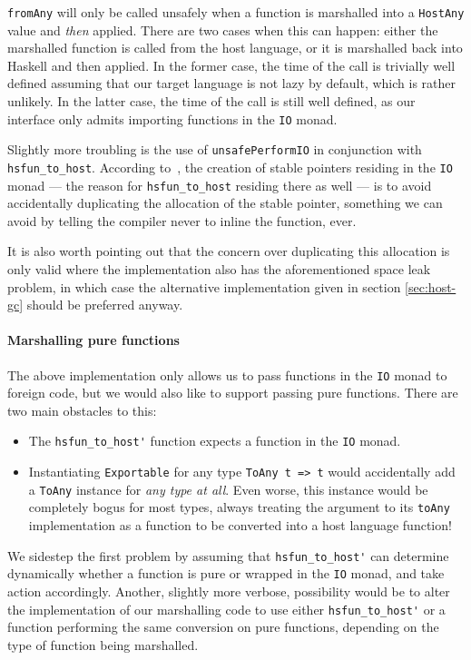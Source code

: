 \documentclass[preprint]{sigplanconf}
\begin{document}
\lstinline!fromAny! will only be called unsafely when a function is marshalled
into a \lstinline!HostAny! value and \emph{then} applied. There are two cases
when this can happen: either the marshalled function is called from the host
language, or it is marshalled back into Haskell and then applied.
In the former case, the time of the call is trivially well defined assuming
that our target language is not lazy by default, which is rather unlikely.
In the latter case, the time of the call is still well defined, as our
interface only admits importing functions in the \lstinline!IO! monad.

Slightly more troubling is the use of \lstinline!unsafePerformIO! in
conjunction with \lstinline!hsfun_to_host!.
According to\ \cite{stableptr}, the creation of stable pointers residing in
the \lstinline!IO! monad --- the reason for \lstinline!hsfun_to_host! residing
there as well --- is to avoid accidentally duplicating the allocation of the
stable pointer, something we can avoid by telling the compiler never to
inline the function, ever.

It is also worth pointing out that the concern over duplicating this allocation
is only valid where the implementation also has the aforementioned space leak
problem, in which case the alternative implementation given in section
\ref{sec:host-gc} should be preferred anyway.

\paragraph{Marshalling pure functions}
The above implementation only allows us to pass functions in the \lstinline!IO!
monad to foreign code, but we would also like to support passing pure
functions. There are two main obstacles to this:

\begin{itemize}
\item
  The \lstinline!hsfun_to_host'! function expects a function in the
  \lstinline!IO! monad.
\item
  Instantiating \lstinline!Exportable! for any type \lstinline!ToAny t => t!
  would accidentally add a \lstinline!ToAny! instance for
  \emph{any type at all}.
  Even worse, this instance would be completely bogus for most types,
  always treating
  the argument to its \lstinline!toAny! implementation as a function to be
  converted into a host language function!
\end{itemize}

We sidestep the first problem by assuming that \lstinline!hsfun_to_host'!
can determine dynamically whether a function is pure or wrapped in the
\lstinline!IO! monad, and take action accordingly.
Another, slightly more verbose, possibility would be to alter the
implementation of our marshalling code to use either
\lstinline!hsfun_to_host'! or a function performing the same conversion
on pure functions, depending on the type of function being marshalled.
\end{document}
